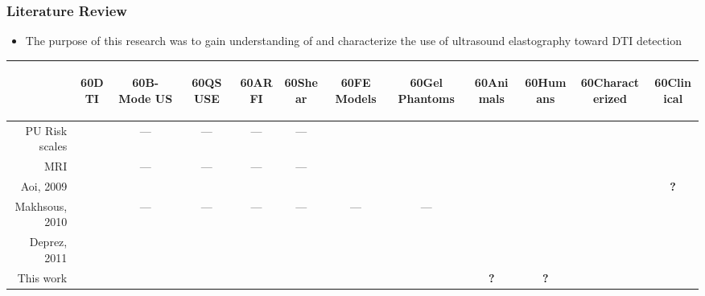 \documentclass{beamer}
\newcommand{\rotHead}[1]{\begin{rotate}{60}#1\end{rotate}}
\newcommand{\cmark}{\color{ExecusharesBlue}\ding{51}}
\newcommand{\xmark}{\color{ExecusharesRed}\ding{55}}
\begin{document}
		\begin{frame}
			\frametitle{Literature Review}
			\begin{itemize}
				\item The \alert{purpose} of this research was to gain understanding of and characterize the use of ultrasound elastography toward DTI detection
			\end{itemize}
			\begin{center}
				\vspace{1cm}
				\begin{tabular}{r|c|cccc|cccc|cc}
					& \rotHead{DTI} & \rotHead{B-Mode US} & \rotHead{QS USE} & \rotHead{ARFI} & \rotHead{Shear} & \rotHead{FE Models} & \rotHead{Gel Phantoms} & \rotHead{Animals} & \rotHead{Humans} & \rotHead{Characterized} & \rotHead{Clinical} \\
					\hline
					PU Risk scales & \xmark & --- & --- & --- & --- & \xmark & \xmark & \xmark & \cmark & \cmark & \cmark \\
					MRI & \cmark & --- & --- & --- & --- & \cmark & \cmark & \cmark& \cmark & \xmark & \xmark \\
					\hline
					Aoi, 2009 & \cmark & \cmark & \xmark & \xmark & \xmark & \xmark & \xmark & \xmark & \cmark & \xmark & \color{ExecusharesBlue}\textbf{?} \\
					Makhsous, 2010 & \cmark & --- & --- & --- & --- & --- & --- & \cmark & \xmark & \xmark & \cmark \\
					Deprez, 2011 & \cmark & \xmark & \cmark & \xmark & \xmark & \cmark & \cmark & \cmark & \xmark & \xmark & \cmark \\
					\hline
					{\color{ExecusharesRed}\ding{220}} This work & \cmark & \xmark & \cmark & \cmark & \cmark & \cmark & \cmark & \color{ExecusharesBlue}\textbf{?} & \color{ExecusharesBlue}\textbf{?} & \cmark & \cmark \\
				\end{tabular}
			\end{center}
		\end{frame}

\end{document}
